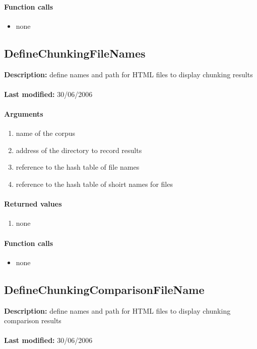 \paragraph{Function calls}
\begin{itemize}
\item none
\end{itemize}

\subsection{DefineChunkingFileNames}
\textbf{Description:} define names and path for HTML files to display chunking results\\
\\\textbf{Last modified:} 30/06/2006

\paragraph{Arguments}
\begin{enumerate}
\item name of the corpus
\item address of the directory to record results
\item reference to the hash table of file names
\item reference to the hash table of shoirt names for files
\end{enumerate}

\paragraph{Returned values}
\begin{enumerate}
\item none
\end{enumerate}

\paragraph{Function calls}
\begin{itemize}
\item none
\end{itemize}

\subsection{DefineChunkingComparisonFileName}
\textbf{Description:} define names and path for HTML files to display chunking comparison results\\
\\\textbf{Last modified:} 30/06/2006

